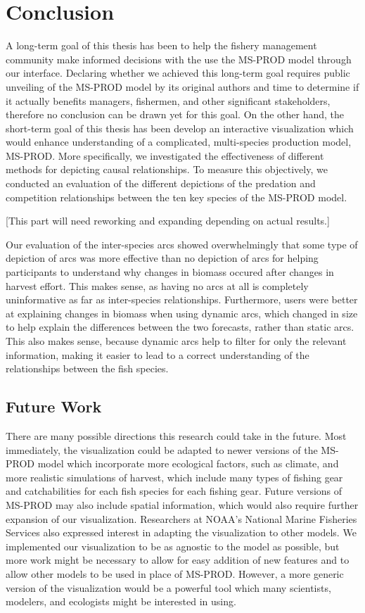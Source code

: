 \chapter{Conclusion}

A long-term goal of this thesis has been to help the fishery management community make informed decisions with the use the MS-PROD model through our interface.  Declaring whether we achieved this long-term goal requires public unveiling of the MS-PROD model by its original authors and time to determine if it actually benefits managers, fishermen, and other significant stakeholders, therefore no conclusion can be drawn yet for this goal.  On the other hand, the short-term goal of this thesis has been develop an interactive visualization which would enhance understanding of a complicated, multi-species production model, MS-PROD.  More specifically, we investigated the effectiveness of different methods for depicting causal relationships.  To measure this objectively, we conducted an evaluation of the different depictions of the predation and competition relationships between the ten key species of the MS-PROD model.

[This part will need reworking and expanding depending on actual results.]

Our evaluation of the inter-species arcs showed overwhelmingly that some type of depiction of arcs was more effective than no depiction of arcs for helping participants to understand why changes in biomass occured after changes in harvest effort.  This makes sense, as having no arcs at all is completely uninformative as far as inter-species relationships.  Furthermore, users were better at explaining changes in biomass when using dynamic arcs, which changed in size to help explain the differences between the two forecasts, rather than static arcs.  This also makes sense, because dynamic arcs help to filter for only the relevant information, making it easier to lead to a correct understanding of the relationships between the fish species.  

\section{Future Work}

There are many possible directions this research could take in the future.  Most immediately, the visualization could be adapted to newer versions of the MS-PROD model which incorporate more ecological factors, such as climate, and more realistic simulations of harvest, which include many types of fishing gear and catchabilities for each fish species for each fishing gear.  Future versions of MS-PROD may also include spatial information, which would also require further expansion of our visualization.  Researchers at NOAA's National Marine Fisheries Services also expressed interest in adapting the visualization to other models.  We implemented our visualization to be as agnostic to the model as possible, but more work might be necessary to allow for easy addition of new features and to allow other models to be used in place of MS-PROD.  However, a more generic version of the visualization would be a powerful tool which many scientists, modelers, and ecologists might be interested in using.

